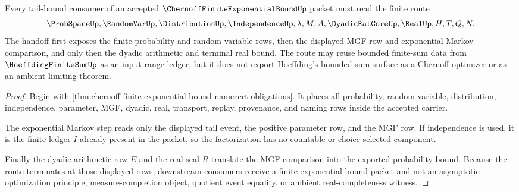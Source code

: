 \begin{theorem}
\label{thm:chernoff-finite-exponential-bound-mgf-handoff}
Every tail-bound consumer of an accepted $\ChernoffFiniteExponentialBoundUp$ packet must read the finite route
$$
\ProbSpaceUp,\RandomVarUp,\DistributionUp,\IndependenceUp,\lambda,M,A,\DyadicRatCoreUp,\RealUp,H,T,Q,N .
$$
The handoff first exposes the finite probability and random-variable rows, then the displayed MGF row and exponential Markov comparison, and only then the dyadic arithmetic and terminal real bound. The route may reuse bounded finite-sum data from $\HoeffdingFiniteSumUp$ as an input range ledger, but it does not export Hoeffding's bounded-sum surface as a Chernoff optimizer or as an ambient limiting theorem.
\end{theorem}
\begin{proof}
Begin with \autoref{thm:chernoff-finite-exponential-bound-namecert-obligations}. It places all probability, random-variable, distribution, independence, parameter, MGF, dyadic, real, transport, replay, provenance, and naming rows inside the accepted carrier.

The exponential Markov step reads only the displayed tail event, the positive parameter row, and the MGF row. If independence is used, it is the finite ledger $I$ already present in the packet, so the factorization has no countable or choice-selected component.

Finally the dyadic arithmetic row $E$ and the real seal $R$ translate the MGF comparison into the exported probability bound. Because the route terminates at those displayed rows, downstream consumers receive a finite exponential-bound packet and not an asymptotic optimization principle, measure-completion object, quotient event equality, or ambient real-completeness witness.
\end{proof}


